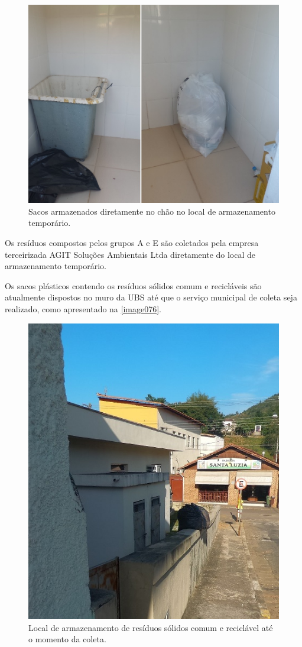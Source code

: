 	\begin{figure}
		\centering
		\includegraphics[width=0.75\linewidth]{produtos/prodtres/image074_75}
		\caption{Sacos armazenados diretamente no chão no local de armazenamento temporário.}
		\label{fig:image074_75}
	\end{figure}

	
	Os resíduos compostos pelos grupos A e E são coletados pela empresa terceirizada AGIT Soluções Ambientais Ltda diretamente do local de armazenamento temporário.
	
	Os sacos plásticos contendo os resíduos sólidos comum e recicláveis são atualmente dispostos no muro da UBS até que o serviço municipal de coleta seja realizado, como apresentado na \autoref{image076}.
	
	\begin{figure}
		\centering
		\includegraphics[width=0.75\linewidth]{produtos/prodtres/image076}
		\caption{Local de armazenamento de resíduos sólidos comum e reciclável até o momento da coleta.}
		\label{fig:image076}
	\end{figure}
	
